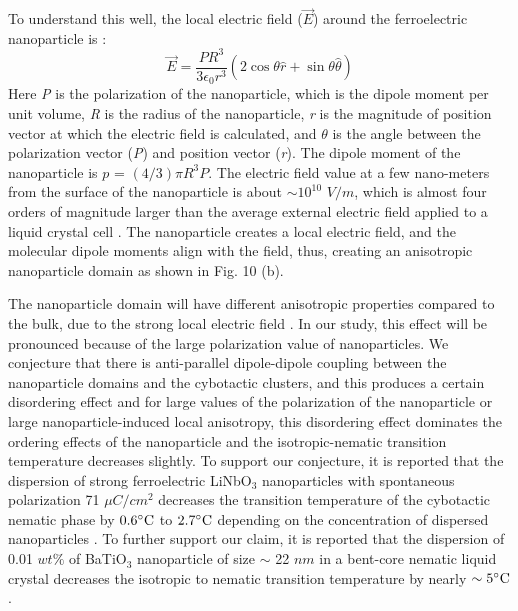 \documentclass[reprint,amsfonts,amsmath,amssymb,aps,pre,floatfix,10pt]{revtex4-1}
\begin{document}
To understand this well, the local electric field (\textit{$\vec{E}$}) around the ferroelectric nanoparticle is \cite{nayek2015superior_17, basu2014soft_40}:
\begin{equation}
\label{local_field}
\vec{E}=\frac{PR^3}{3\epsilon_0 r^3}(2\cos \theta \hat{r} + \sin \theta \hat{\theta})
\end{equation}
Here \textit{P} is the polarization of the nanoparticle, which is the dipole moment per unit volume, \textit{R} is the radius of the nanoparticle, \textit{r} is the magnitude of position vector at which the electric field is calculated, and $\theta$ is the angle between the polarization vector (\textit{P}) and position vector (\textit{r}). The dipole moment of the nanoparticle is $p$ = $(4/3)\pi R^3P$. The electric field value at a few nano-meters from the surface of the nanoparticle is about $\sim 10^{10}$ $V/m$, which is almost four orders of magnitude larger than the average external electric field applied to a liquid crystal cell \cite{basu2014soft_40}. The nanoparticle creates a local electric field, and the molecular dipole moments align with the field, thus, creating an anisotropic nanoparticle domain \cite{kumar2018nanodoping_12, lopatina2009theory_13} as shown in Fig. 10 (b).



The nanoparticle domain will have different anisotropic properties compared to the bulk, due to the strong local electric field \cite{basu2014soft_40}. In our study, this effect will be pronounced because of the large polarization value of nanoparticles. We conjecture that there is anti-parallel dipole-dipole coupling between the nanoparticle domains and the cybotactic clusters, and this produces a certain disordering effect and for large values of the polarization of the nanoparticle or large nanoparticle-induced local anisotropy, this disordering effect dominates the ordering effects of the nanoparticle and the isotropic-nematic transition temperature decreases slightly. To support our conjecture, it is reported that the dispersion of strong ferroelectric LiNbO$_{3}$ nanoparticles with spontaneous polarization 71 $\mu C/cm^2$ decreases the transition temperature of the cybotactic nematic phase by $0.6 ^{\circ}{\rm C}$ to $2.7 ^{\circ}{\rm C}$ depending on the concentration of dispersed nanoparticles \cite{derbali2020dielectric_33}. To further support our claim, it is reported that the dispersion of 0.01 $wt$$\%$ of BaTiO$_{3}$ nanoparticle of size $\sim$ 22 $nm$ in a bent-core nematic liquid crystal decreases the isotropic to nematic transition temperature by nearly $\sim 5 ^{\circ}{\rm C}$ \cite{khan2017elastic_11}. 
\end{document}
